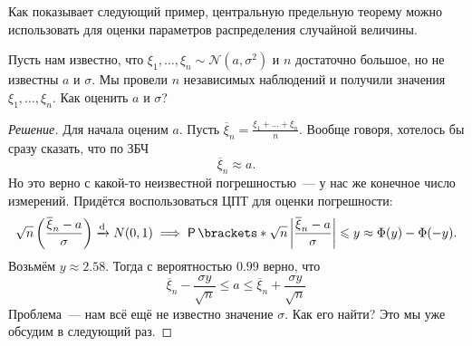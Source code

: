 Как показывает следующий пример, центральную предельную теорему можно 
использовать для оценки параметров распределения случайной величины.
\begin{example}
	Пусть нам известно, что \(\xi_{1}, \dots, \xi_{n} \sim \mathcal{N}(a, 
	\sigma^2)\) и \(n\) достаточно большое, но не известны \(a\) и \(\sigma\). 
	Мы провели \(n\) независимых наблюдений и получили значения \(\xi_{1}, 
	\dots, \xi_{n}\). Как оценить \(a\) и \(\sigma\)?
\end{example}
\begin{proof}[Решение]
	Для начала оценим \(a\). Пусть \(\overline{\xi}_n = \frac{\xi_{1} + \dots + 
	\xi_{n}}{n}\). Вообще говоря, хотелось бы сразу сказать, что по ЗБЧ
	\[
		\overline{\xi}_n \approx a.
	\]
	Но это верно с какой-то неизвестной погрешностью~--- у нас же конечное 
	число измерений. Придётся воспользоваться ЦПТ для оценки погрешности:
	\[
		\sqrt{n}\left(\frac{\overline{\xi}_n - a}{\sigma}\right) \dto N(0, 1) 
		\implies \Pr{\sqrt{n}\left|\frac{\overline{\xi}_n - a}{\sigma}\right| 
		\leq y} \approx \Phi(y) - \Phi(-y).
	\]
	Возьмём \(y \approx 2.58\). Тогда с вероятностью \(0.99\) верно, что
	\[
		\overline{\xi}_n - \frac{\sigma y}{\sqrt{n}} \leq a \leq 
		\overline{\xi}_n + \frac{\sigma y}{\sqrt{n}}
	\]
	Проблема~--- нам всё ещё не известно значение \(\sigma\). Как его найти? 
	Это мы уже обсудим в следующий раз.
\end{proof}